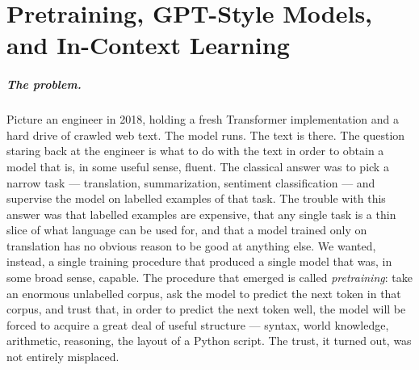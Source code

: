 \chapter{Pretraining, GPT-Style Models, and In-Context Learning}
\label{chap:pretraining}
\label{sec:ch6-pretrain}

\scenelabel
\begin{scenestrip}
\end{scenestrip}

\paragraph{The problem.}
Picture an engineer in 2018, holding a fresh Transformer
implementation and a hard drive of crawled web text. The model
runs. The text is there. The question staring back at the
engineer is what to do with the text in order to obtain a model
that is, in some useful sense, fluent. The classical answer was to pick a
narrow task --- translation, summarization, sentiment classification
--- and supervise the model on labelled examples of that task. The
trouble with this answer was that labelled examples are expensive,
that any single task is a thin slice of what language can be used
for, and that a model trained only on translation has no obvious
reason to be good at anything else. We wanted, instead, a single
training procedure that produced a single model that was, in some
broad sense, capable. The procedure that emerged is called
\emph{pretraining}: take an enormous unlabelled corpus, ask the
model to predict the next token in that corpus, and trust that, in
order to predict the next token well, the model will be forced to
acquire a great deal of useful structure --- syntax, world
knowledge, arithmetic, reasoning, the layout of a Python script.
The trust, it turned out, was not entirely misplaced.

